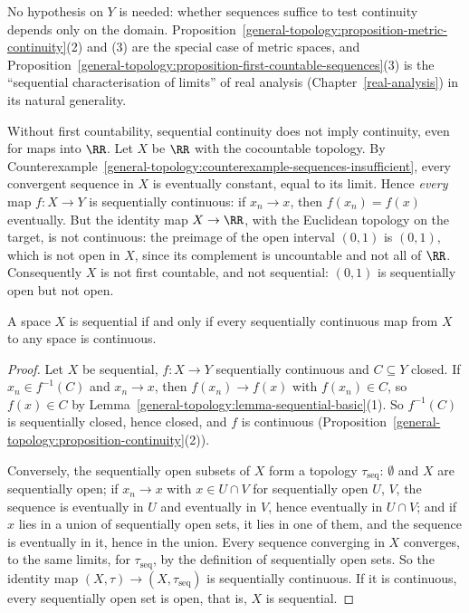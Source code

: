 No hypothesis on $Y$ is needed: whether sequences suffice to test continuity depends only on the domain. Proposition~\ref{general-topology:proposition-metric-continuity}(2) and (3) are the special case of metric spaces,
and Proposition~\ref{general-topology:proposition-first-countable-sequences}(3) is the ``sequential characterisation of limits'' of real analysis (Chapter~\ref{real-analysis}) in its natural generality.

\begin{counterexample}\label{general-topology:counterexample-sequentially-continuous}
Without first countability, sequential continuity does not imply continuity, even for maps into $\RR$. Let $X$ be $\RR$ with the cocountable topology. By
Counterexample~\ref{general-topology:counterexample-sequences-insufficient}, every convergent sequence in $X$ is eventually constant, equal to its limit. Hence \emph{every} map $f \colon X \to Y$ is sequentially continuous: if
$x_n \to x$, then $f(x_n) = f(x)$ eventually. But the identity map $X \to \RR$, with the Euclidean topology on the target, is not continuous: the preimage of the open interval $(0, 1)$ is $(0, 1)$, which is not open in $X$,
since its complement is uncountable and not all of $\RR$. Consequently $X$ is not first countable, and not sequential: $(0, 1)$ is sequentially open but not open.
\end{counterexample}

\begin{proposition}\label{general-topology:proposition-sequential-spaces}
A space $X$ is sequential if and only if every sequentially continuous map from $X$ to any space is continuous.
\end{proposition}

\begin{proof}
Let $X$ be sequential, $f \colon X \to Y$ sequentially continuous and $C \subseteq Y$ closed. If $x_n \in f^{-1}(C)$ and $x_n \to x$, then $f(x_n) \to f(x)$ with $f(x_n) \in C$, so $f(x) \in C$ by
Lemma~\ref{general-topology:lemma-sequential-basic}(1). So $f^{-1}(C)$ is sequentially closed, hence closed, and $f$ is continuous (Proposition~\ref{general-topology:proposition-continuity}(2)).

Conversely, the sequentially open subsets of $X$ form a topology $\tau_{\mathrm{seq}}$: $\emptyset$ and $X$ are sequentially open; if $x_n \to x$ with $x \in U \cap V$ for sequentially open $U$, $V$, the sequence is eventually in $U$
and eventually in $V$, hence eventually in $U \cap V$; and if $x$ lies in a union of sequentially open sets, it lies in one of them, and the sequence is eventually in it, hence in the union. Every sequence converging in
$X$ converges, to the same limits, for $\tau_{\mathrm{seq}}$, by the definition of sequentially open sets. So the identity map $(X, \tau) \to (X, \tau_{\mathrm{seq}})$ is sequentially continuous. If it is continuous, every
sequentially open set is open, that is, $X$ is sequential.
\end{proof}

